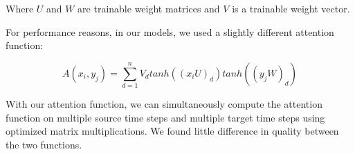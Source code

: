 \documentclass{article} %
\begin{document}
Where $U$ and $W$ are trainable weight matrices and $V$ is a trainable weight vector.  

For performance reasons, in our models, we used a slightly different attention function:

\begin{equation}\label{eq:ourattention}
A(x_i, y_j) = \sum_{d=1}^{n}V_d tanh((x_iU)_d) tanh((y_jW)_d)
\end{equation}

With our attention function, we can simultaneously compute the attention function on multiple source time steps and multiple target time steps using optimized matrix multiplications.  We found little difference in quality between the two functions.
\end{document}
